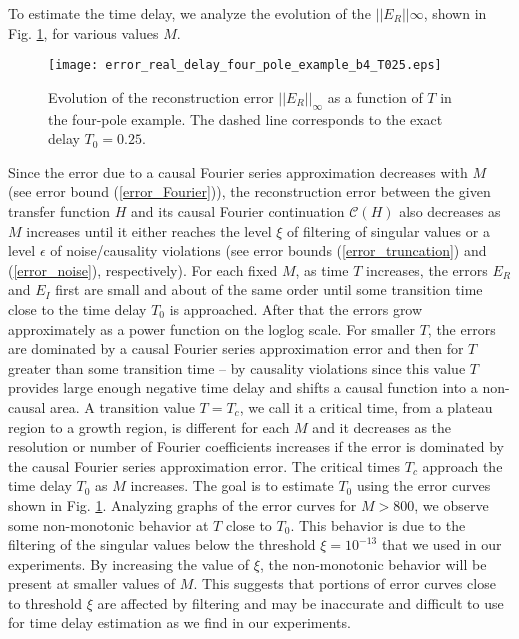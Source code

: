 \documentclass[journal,twoside]{IEEEtran}
\begin{document}
To estimate the time delay, we analyze the evolution of the $||E_R||\infty$, shown in Fig. \ref{Ffour_pole1}, for various values $M$. 
\begin{figure}[h] \begin{center}
\texttt{[image: error\_real\_delay\_four\_pole\_example\_b4\_T025.eps]}
\end{center}
\caption{Evolution of the reconstruction error $||E_R||_\infty$ as a function of $T$ in the four-pole example. The dashed line corresponds to the exact delay $T_0=0.25$.} 
\label{Ffour_pole1}
\end{figure}
Since the error due to a causal Fourier series approximation decreases with $M$ (see error bound (\ref{error_Fourier})), the reconstruction error between the given transfer function $H$ and its causal Fourier continuation ${\mathcal C}(H)$  also  decreases as $M$ increases until it  either reaches the level $\xi$ of filtering of singular values or a level $\epsilon$ of noise/causality violations (see error bounds (\ref{error_truncation}) and  (\ref{error_noise}), respectively). 
For each fixed $M$, as time $T$ increases, the errors $E_R$ and $E_I$ first are small and about of the same order until some transition time close to the time delay $T_0$ is approached. After that the errors  grow approximately as a power function on the loglog scale. For smaller $T$, the errors are dominated by a causal Fourier series approximation error and then for $T$ greater than some transition time -- by causality violations since this value $T$ provides large enough negative time delay and shifts a causal function into a non-causal area.
A transition value $T=T_c$, we call it a critical  time, from a plateau region to a growth region, is different for each $M$ and it decreases as the resolution or number of Fourier coefficients increases if the error is dominated by the causal Fourier series approximation error. The critical times $T_c$ approach the time delay $T_0$ as $M$ increases. The goal is to estimate $T_0$ using the error curves  shown in Fig. \ref{Ffour_pole1}.
Analyzing graphs of the error curves  for $M>800$, we observe some non-monotonic behavior at $T$ close to $T_0$. This behavior is due to the filtering of the singular values below the threshold $\xi=10^{-13}$ that we used in our experiments. By increasing the value of $\xi$, the non-monotonic behavior will be present at smaller values of $M$. This suggests that portions of error curves close to threshold $\xi$ are affected by filtering and may be inaccurate and difficult to use for time delay estimation as we  find in our experiments.
\end{document}
